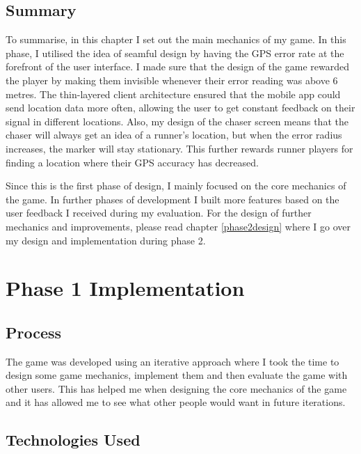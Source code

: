 \documentclass{l4proj}
\begin{document}
\section{Summary}
To summarise, in this chapter I set out the main mechanics of my game. In this phase, I utilised the idea of seamful design
by having the GPS error rate at the forefront of the user interface. I made sure that the design of the game rewarded the player
by making them invisible whenever their error reading was above 6 metres. The thin-layered client architecture ensured that the
mobile app could send location data more often, allowing the user to get constant feedback on their signal in different locations.
Also, my design of the chaser screen means that the chaser will always get an idea of a runner's location, but when the error radius
increases, the marker will stay stationary. This further rewards runner players for finding a location where their GPS accuracy
has decreased.

Since this is the first phase of design, I mainly focused on the core mechanics of the game. In further phases of development I
built more features based on the user feedback I received during my evaluation. For the design of further mechanics and improvements,
please read chapter \ref{phase2design} where I go over my design and implementation during phase 2.


\chapter{Phase 1 Implementation}
\label{phase1implementation}

\section{Process}
\label{process}
The game was developed using an iterative approach where I took the time to design some game mechanics, implement them and
then evaluate the game with other users. This has helped me when designing the core mechanics of the game and it has allowed me
to see what other people would want in future iterations.

\section{Technologies Used}
\end{document}
